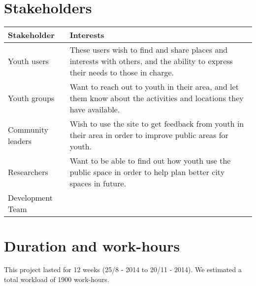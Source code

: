 \section{Stakeholders}
\begin{tabular}{|l|p{8cm}|}
\hline
\textbf{Stakeholder} & \textbf{Interests} \\
\hline
Youth users          & These users wish to find and share places and interests with others, and the ability to express their needs to those in charge. \\
\hline
Youth groups         & Want to reach out to youth in their area, and let them know about the activities and locations they have available. \\
\hline
Community leaders    & Wish to use the site to get feedback from youth in their area in order to improve public areas for youth. \\
\hline
Researchers          & Want to be able to find out how youth use the public space in order to help plan better city spaces in future. \\
\hline
Development Team     & \\
\hline
\end{tabular}

%

\section{Duration and work-hours} This project lasted for 12 weeks (25/8 - 2014 to 20/11 - 2014). We estimated a total workload of 1900 work-hours.